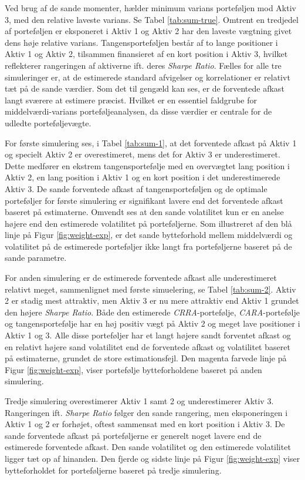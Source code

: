 \documentclass[
  a4paper,
  oneside]{memoir}
\begin{document}
Ved brug af de sande momenter, hælder minimum varians porteføljen mod Aktiv 3, med den relative laveste varians. Se Tabel \ref{tab:sum-true}. Omtrent en tredjedel af porteføljen er eksponeret i Aktiv 1 og Aktiv 2 har den laveste vægtning givet dens høje relative varians. Tangensporteføljen består af to lange positioner i Aktiv 1 og Aktiv 2, tilsammen finansieret af en kort position i Aktiv 3, hvilket reflekterer rangeringen af aktiverne ift. deres \emph{Sharpe Ratio}.
Fælles for alle tre simuleringer er, at de estimerede standard afvigelser og korrelationer er relativt tæt på de sande værdier. Som det til gengæld kan ses, er de forventede afkast langt sværere at estimere præcist. Hvilket er en essentiel faldgrube for middelværdi-varians porteføljeanalysen, da disse værdier er centrale for de udledte porteføljevægte.

For første simulering ses, i Tabel \ref{tab:sum-1}, at det forventede afkast på Aktiv 1 og specielt Aktiv 2 er overestimeret, mens det for Aktiv 3 er underestimeret. Dette medfører en ekstrem tangensportefølje med en overvægtet lang position i Aktiv 2, en lang position i Aktiv 1 og en kort position i det underestimerede Aktiv 3. De sande forventede afkast af tangensporteføljen og de optimale porteføljer for første simulering er signifikant lavere end det forventede afkast baseret på estimaterne. Omvendt ses at den sande volatilitet kun er en anelse højere end den estimerede volatilitet på porteføljerne. Som illustreret af den blå linje på Figur \ref{fig:weight-exp}, er det sande bytteforhold mellem middelværdi og volatilitet på de estimerede porteføljer ikke langt fra porteføljerne baseret på de sande parametre.

For anden simulering er de estimerede forventede afkast alle underestimeret relativt meget, sammenlignet med første simuelering, se Tabel \ref{tab:sum-2}. Aktiv 2 er stadig mest attraktiv, men Aktiv 3 er nu mere attraktiv end Aktiv 1 grundet den højere \emph{Sharpe Ratio}. Både den estimerede \emph{CRRA}-portefølje, \emph{CARA}-portefølje og tangensportefølje har en høj positiv vægt på Aktiv 2 og meget lave positioner i Aktiv 1 og 3. Alle disse porteføljer har et langt højere sandt forventet afkast og en relativt højere sand volatilitet end de forventede afkast og volatilitet baseret på estimaterne, grundet de store estimationsfejl. Den magenta farvede linje på Figur \ref{fig:weight-exp}, viser portefølje bytteforholdene baseret på anden simulering.

Tredje simulering overestimerer Aktiv 1 samt 2 og underestimerer Aktiv 3. Rangeringen ift. \emph{Sharpe Ratio} følger den sande rangering, men eksponeringen i Aktiv 1 og 2 er forhøjet, oftest sammensat med en kort position i Aktiv 3. De sande forventede afkast på porteføljerne er generelt noget lavere end de estimerede forventede afkast. Den sande volatilitet og den estimerede volatilitet ligger tæt op af hinanden. Den fjerde og sidste linje på Figur \ref{fig:weight-exp} viser bytteforholdet for porteføljerne baseret på tredje simulering.
\end{document}
